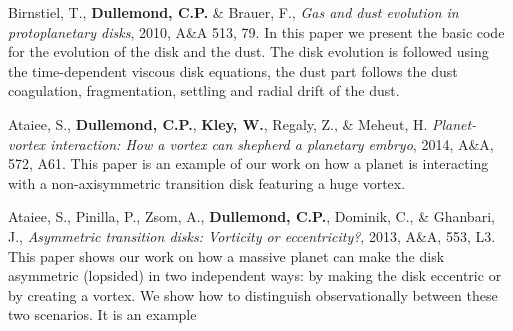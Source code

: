 \documentclass[10pt,fleqn,twoside,a4paper]{article}
\begin{document}

\begin{literature}
\item Birnstiel, T., {\bf Dullemond, C.P.} \& Brauer, F., {\em Gas and dust
    evolution in protoplanetary disks}, 2010, A\&A 513, 79. In this paper we
  present the basic code for the evolution of the disk and the dust. The
  disk evolution is followed using the time-dependent viscous disk
  equations, the dust part follows the dust coagulation, fragmentation,
  settling and radial drift of the dust.
\item Ataiee, S., {\bf Dullemond, C.P.}, {\bf Kley, W.}, Regaly, Z., \&
  Meheut, H. {\em Planet-vortex interaction: How a vortex can shepherd a
    planetary embryo}, 2014, A\&A, 572, A61. This paper is an example of our
  work on how a planet is interacting with a non-axisymmetric transition
  disk featuring a huge vortex.
\item Ataiee, S., Pinilla, P., Zsom, A., {\bf Dullemond, C.P.}, Dominik, C.,
  \& Ghanbari, J., {\em Asymmetric transition disks: Vorticity or
    eccentricity?}, 2013, A\&A, 553, L3. This paper shows our work on how a
  massive planet can make the disk asymmetric (lopsided) in two independent
  ways: by making the disk eccentric or by creating a vortex. We show how to
  distinguish observationally between these two scenarios. It is an example

\end{literature}
\end{document}
